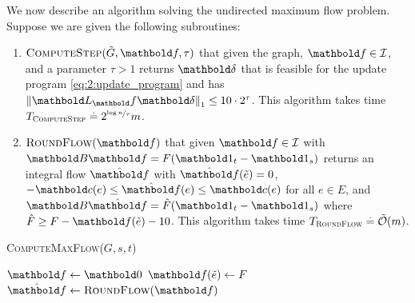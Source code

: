 \documentclass[nobib]{tufte-handout}
\newcommand{\etil}{\Tilde{e}}
\newcommand{\barrierflowset}{\mathcal{I}}
\begin{document}
We now describe an algorithm solving the undirected maximum flow problem. Suppose we are given the following subroutines: \begin{enumerate}
    \item $\textsc{ComputeStep}(\Tilde{G}, \vf, \tau)$ that given the graph, $\vf \in \barrierflowset$, and a parameter $\tau > 1$ returns $\vdelta$ that is feasible for the update program \eqref{eq:2:update_program} and has $\norm{\mL_\vf\vdelta}_1 \leq 10 \cdot 2^\tau$. This algorithm takes time $T_{\textsc{ComputeStep}} \overset{.}{=} 2^{\nicefrac{\log n}{\tau}} m$.
    
    \item $\textsc{RoundFlow}(\vf)$ that given $\vf \in \barrierflowset$ with $\mB\vf = F(\vOne_t - \vOne_s)$ returns an integral flow $\hat{\vf}$ with $\hat{\vf}(\etil) = 0$, $-\vc(e) \leq \hat{\vf}(e) \leq \vc(e)$ for all $e \in E$, and $\mB\hat{\vf} = \hat{F}(\vOne_t - \vOne_s)$ where $\hat{F} \geq F - \vf(\etil) - 10$. This algorithm takes time $T_{\textsc{RoundFlow}} \defeq \TildeLandauO{m}$.
\end{enumerate}

\begin{algorithm}
    \caption{\textsc{ComputeMaxFlow($G, s, t$)}}\label{alg:2}
    $\vf \gets \vZero$\;
    $\vf(\etil) \gets F$\;
    $\hat{\vf} \gets \textsc{RoundFlow}(\vf)$\;
    \Return{$\hat{\vf}$}
\end{algorithm}
\end{document}
